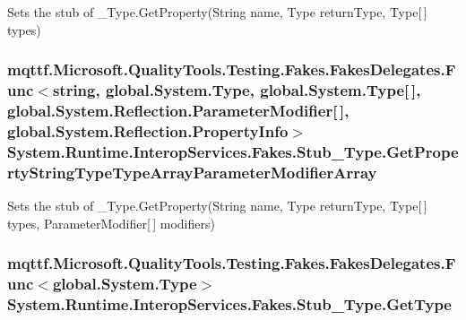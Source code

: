 Sets the stub of \-\_\-\-Type.\-Get\-Property(\-String name, Type return\-Type, Type\mbox{[}$\,$\mbox{]} types)

\hypertarget{class_system_1_1_runtime_1_1_interop_services_1_1_fakes_1_1_stub___type_a7c16f7106283e37e28aca76fcf18f25a}{
\subsubsection[{Get\-Property\-String\-Type\-Type\-Array\-Parameter\-Modifier\-Array}]{\setlength{\rightskip}{0pt plus 5cm}mqttf.\-Microsoft.\-Quality\-Tools.\-Testing.\-Fakes.\-Fakes\-Delegates.\-Func$<$string, global.\-System.\-Type, global.\-System.\-Type\mbox{[}$\,$\mbox{]}, global.\-System.\-Reflection.\-Parameter\-Modifier\mbox{[}$\,$\mbox{]}, global.\-System.\-Reflection.\-Property\-Info$>$ System.\-Runtime.\-Interop\-Services.\-Fakes.\-Stub\-\_\-\-Type.\-Get\-Property\-String\-Type\-Type\-Array\-Parameter\-Modifier\-Array}}\label{class_system_1_1_runtime_1_1_interop_services_1_1_fakes_1_1_stub___type_a7c16f7106283e37e28aca76fcf18f25a}


Sets the stub of \-\_\-\-Type.\-Get\-Property(\-String name, Type return\-Type, Type\mbox{[}$\,$\mbox{]} types, Parameter\-Modifier\mbox{[}$\,$\mbox{]} modifiers)

\hypertarget{class_system_1_1_runtime_1_1_interop_services_1_1_fakes_1_1_stub___type_a295aff1bc1d4846c3880ac6d383ca389}{
\subsubsection[{Get\-Type}]{\setlength{\rightskip}{0pt plus 5cm}mqttf.\-Microsoft.\-Quality\-Tools.\-Testing.\-Fakes.\-Fakes\-Delegates.\-Func$<$global.\-System.\-Type$>$ System.\-Runtime.\-Interop\-Services.\-Fakes.\-Stub\-\_\-\-Type.\-Get\-Type}}\label{class_system_1_1_runtime_1_1_interop_services_1_1_fakes_1_1_stub___type_a295aff1bc1d4846c3880ac6d383ca389}


